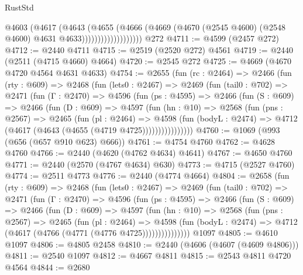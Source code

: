 \begin{lexlean}{RustStd}
\begin{coremodule}
                            @4603
                              (@4617
                                (@4643
                                  (@4655
                                    (@4666
                                      (@4669
                                        (@4670
                                          (@2545 @4600)
                                          (@2548 @4600)
                                          @4631
                                          @4633)))))))))))))))))))
    @272
@4711 := @4599 (@2457 @272)
@4712 := @2440 @4711
@4715 := @2519 (@2520 @272) @4561
@4719 := @2440 (@2511 (@4715 @4660) @4664)
@4720 := @2545 @272
@4725 := @4669 (@4670 @4720 @4564 @4631 @4633)
@4754 := @2655
    (fun (rc : @2464) =>
    @2466
      (fun (rty : @609) =>
      @2468
        (fun (lets0 : @2467) =>
        @2469
          (fun (tail0 : @702) =>
          @2471
            (fun (Γ : @2470) =>
            @4596
              (fun (ps : @4595) =>
              @2466
                (fun (S : @609) =>
                @2466
                  (fun (D : @609) =>
                  @4597
                    (fun (hn : @10) =>
                    @2568
                      (fun (pns : @2567) =>
                      @2465
                        (fun (pl : @2464) =>
                        @4598
                          (fun (bodyL : @2474) =>
                          @4712 (@4617 (@4643 (@4655 (@4719 @4725))))))))))))))))
@4760 := @1069 (@993 (@656 (@657 @910 @623) @666))
@4761 := @4754 @4760
@4762 := @4628 @4760
@4766 := @2440 (@4620 (@4762 @4634) @4641)
@4767 := @4650 @4760
@4771 := @2440 (@2570 (@4767 @4634) @630)
@4773 := @4715 (@2527 @4760)
@4774 := @2511 @4773
@4776 := @2440 (@4774 @4664)
@4804 := @2658
    (fun (rty : @609) =>
    @2468
      (fun (lets0 : @2467) =>
      @2469
        (fun (tail0 : @702) =>
        @2471
          (fun (Γ : @2470) =>
          @4596
            (fun (ps : @4595) =>
            @2466
              (fun (S : @609) =>
              @2466
                (fun (D : @609) =>
                @4597
                  (fun (hn : @10) =>
                  @2568
                    (fun (pns : @2567) =>
                    @2465
                      (fun (pl : @2464) =>
                      @4598
                        (fun (bodyL : @2474) =>
                        @4712 (@4617 (@4766 (@4771 (@4776 @4725)))))))))))))))
    @1097
@4805 := @4610 @1097
@4806 := @4805 @2458
@4810 := @2440 (@4606 (@4607 (@4609 @4806)))
@4811 := @2540 @1097
@4812 := @4667 @4811
@4815 := @2543 @4811 @4720 @4564
@4844 := @2680

\end{coremodule}
\end{lexlean}
